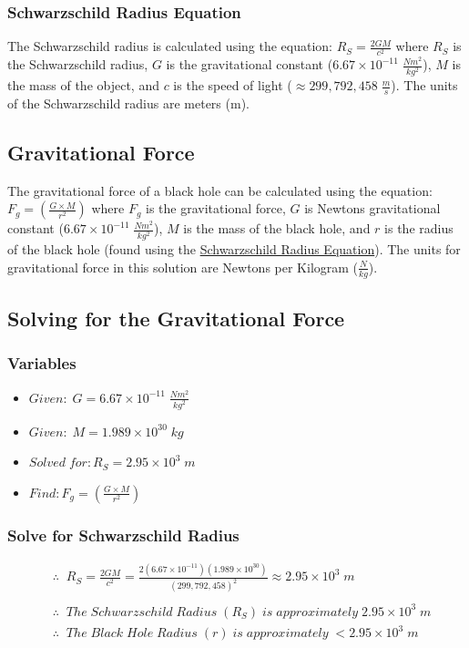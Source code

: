\documentclass{article}
\begin{document}
\subsubsection{Schwarzschild Radius Equation}\label{sec:schwarzschild_radius_equation}
The Schwarzschild radius is calculated using the equation: $R_{S} = \frac{2GM}{c^2}$ where $R_{S}$ is the Schwarzschild radius, $G$ is the gravitational constant (\hyperref[sec:constants]{$6.67 \times 10^{-11}\;\frac{Nm^2}{kg^2}$}), $M$ is the mass of the object, and $c$ is the speed of light (\hyperref[sec:constants]{$\approx 299, 792, 458\;\frac{m}{s}$}). The units of the Schwarzschild radius are meters (m).

\subsection{Gravitational Force}
The gravitational force of a black hole can be calculated using the equation: $F_g = \left(\frac{G\times M}{r^2}\right)$ where $F_g$ is the gravitational force, $G$ is Newtons gravitational constant (\hyperref[sec:constants]{$6.67 \times 10^{-11}\;\frac{Nm^2}{kg^2}$}), $M$ is the mass of the black hole, and $r$ is the radius of the black hole (found using the \hyperref[sec:schwarzschild_radius_equation]{Schwarzschild Radius Equation}). The units for gravitational force in this solution are Newtons per Kilogram ($\frac{N}{kg}$).

\subsection{Solving for the Gravitational Force}
\subsubsection{Variables}
\begin{itemize}
    \item $Given:\; G = 6.67 \times 10^{-11}\;\frac{Nm^2}{kg^2}$
    \item $Given:\; M = 1.989\times 10^{30}\;kg$
    \item $Solved\; for: R_S = 2.95 \times 10^{3}\;m$
    \item $Find: F_g = \left(\frac{G\times M}{r^2}\right)$
\end{itemize}\leavevmode

\subsubsection{Solve for Schwarzschild Radius}
\begin{align*}
     & \therefore\;\; R_{S} = \frac{2GM}{c^2} = \frac{2(6.67 \times 10^{-11})(1.989\times 10^{30})}{(299,792,458)^2} \approx 2.95 \times 10^{3} \;m \\\\
     & \therefore\;\; The\; Schwarzschild\; Radius\; (R_{S})\; is\; approximately\; 2.95 \times 10^{3} \;m                                          \\
     & \therefore\;\; The\; Black\; Hole\; Radius\; (r)\; is\; approximately\; < 2.95 \times 10^{3} \;m
\end{align*}\leavevmode
\end{document}
